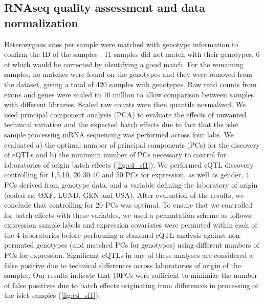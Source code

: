 \subsection{RNAseq quality assessment and data normalization}
Heterozygous sites per sample were matched with genotype information to confirm the ID of the samples \cite{thoenReproducibilityHighthroughputMRNA2013}. 11 samples did not match with their genotypes, 6 of which would be corrected by identifying a good match. For the remaining samples, no matches were found on the genotypes and they were removed from the dataset, giving a total of 420 samples with genotypes. Raw read counts from exons and genes were scaled to 10 million to allow comparison between samples with different libraries. Scaled raw counts were then quantile normalized. We used principal component analysis (PCA) to evaluate the effects of unwanted technical variation and the expected batch effects due to fact that the islet sample processing mRNA sequencing was performed across four labs. We evaluated a) the optimal number of principal components (PCs) for the discovery of eQTLs and b) the minimum number of PCs necessary to control for laboratories of origin batch effects (\ref{fig:c4_sf1}). We performed eQTL discovery controlling for 1,5,10, 20 30 40 and 50 PCs for expression, as well as gender, 4 PCs derived from genotype data, and a variable defining the laboratory of origin (coded as: OXF, LUND, GEN and USA). After evaluation of the results, we conclude that controlling for 20 PCs was optimal. To ensure that we controlled for batch effects with these variables, we used a permutation scheme as follows: expression sample labels and expression covariates were permuted within each of the 4 laboratories before performing a standard eQTL analysis against non-permuted genotypes (and matched PCs for genotypes) using different numbers of PCs for expression. Significant eQTLs in any of these analyses are considered a false positive due to technical differences across laboratories of origin of the samples. Our results indicate that 10PCs were sufficient to minimize the number of false positives due to batch effects originating from differences in processing of the islet samples (\ref{fig:c4_sf1}).	

